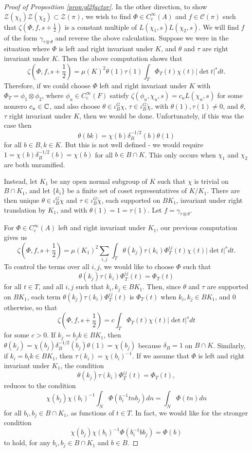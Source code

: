 \begin{proof}[Proof of Proposition \ref{prop:gl2factor}]
    In the other direction, to show $\mathcal Z(\chi_1)\mathcal Z(\chi_2) \subset \mathcal Z(\pi)$, we wish to find $\Phi \in C_c^\infty(A)$ and $f \in \mathcal C(\pi)$ such that $\zeta(\Phi,f,s+\frac{1}{2})$ is a constant multiple of $L(\chi_1,s)L(\chi_2,s)$. We will find $f$ of the form $\gamma_{\tau \otimes \theta}$ and reverse the above calculation. Suppose we were in the situation where $\Phi$ is left and right invariant under $K$, and $\theta$ and $\tau$ are right invariant under $K$. Then the above computation shows that 
    $$\zeta\left(\Phi,f,s+\frac{1}{2}\right) = \mu(K)^2 \theta(1)\tau(1) \int_T \Phi_T(t)\chi(t)|\det t|^s dt.$$
    Therefore, if we could choose $\Phi$ left and right invariant under $K$ with $\Phi_T = \phi_1\otimes \phi_2$, where $\phi_u \in C_c^\infty(F)$ satisfy $\zeta(\phi_u,\chi_u,s)=c_uL(\chi_u,s)$ for some nonzero $c_u \in \mathbb{C}$, and also choose $\theta \in \iota_B^G \chi$, $\tau \in \iota_B^G \check{\chi}$, with $\theta(1), \tau(1) \neq 0$, and $\theta$, $\tau$ right invariant under $K$, then we would be done. Unfortunately, if this was the case then $$\theta(bk) = \chi(b) \delta_B^{-1/2}(b) \theta(1)$$ for all $b \in B, k \in K$. But this is not well defined - we would require $1=\chi(b)\delta_B^{-1/2}(b) = \chi(b)$ for all $b \in B \cap K$. This only occurs when $\chi_1$ and $\chi_2$ are both unramified.

    Instead, let $K_1$ be any open normal subgroup of $K$ such that $\chi$ is trivial on $B \cap K_1$, and let $\{k_i\}$ be a finite set of coset representatives of $K/K_1$. There are then unique $\theta \in \iota_B^G \chi$ and $\tau \in \iota_B^G \check{\chi}$, each supported on $BK_1$, invariant under right translation by $K_1$, and with $\theta(1)=1=\tau(1)$. Let $f=\gamma_{\tau \otimes \theta}$.
    
    For $\Phi \in C_c^\infty(A)$ left and right invariant under $K_1$, our previous computation gives us
    $$\zeta\left(\Phi,f,s+\frac{1}{2}\right) = \mu(K_1)^2 \sum\limits_{i,j}  \int_T \theta(k_j)\tau(k_i)\Phi_T^{ij}(t)\chi(t)|\det t|^s dt.
    $$
    To control the terms over all $i,j$, we would like to choose $\Phi$ such that 
    $$\theta(k_j)\tau(k_i)\Phi_T^{ij}(t) = \Phi_T(t)$$
    for all $t \in T$, and all $i,j$ such that $k_i,k_j \in BK_1$. Then, since $\theta$ and $\tau$ are supported on $BK_1$, each term $\theta(k_j)\tau(k_i)\Phi_T^{ij}(t)$ is $\Phi_T(t)$ when $k_i,k_j \in BK_1$, and 0 otherwise, so that
    $$\zeta\left(\Phi,f,s+\frac{1}{2}\right) = c \int_T \Phi_T(t) \chi(t) |\det t|^s dt$$ for some $c>0$. If $k_j = b_jk \in BK_1$, then $\theta(k_j) = \chi(b_j)\delta_B^{-1/2}(b_j)\theta(1) = \chi(b_j)$ because $\delta_B=1$ on $B \cap K$. Similarly, if $k_i=b_ik \in BK_1$, then $\tau(k_i)=\chi(b_i)^{-1}$. If we assume that $\Phi$ is left and right invariant under $K_1$, the condition $$\theta(k_j)\tau(k_i)\Phi_T^{ij}(t) = \Phi_T(t),$$ reduces to the condition
    $$\chi(b_j)\chi(b_i)^{-1} \int_N \Phi(b_i^{-1}tnb_j) dn = \int_N \Phi(tn)dn$$ for all $b_i,b_j \in B \cap K_1$, as functions of $t \in T$. In fact, we would like for the stronger condition
    $$\chi(b_j)\chi(b_i)^{-1}\Phi(b_i^{-1}bb_j) = \Phi(b)$$
    to hold, for any $b_i,b_j \in B\cap K_1$ and $b \in B$.


\end{proof}
